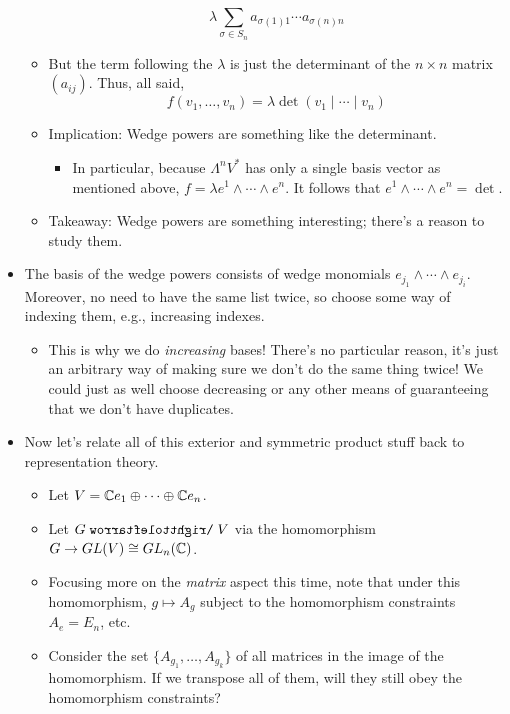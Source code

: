 \documentclass[../notes.tex]{subfiles}
\begin{document}
\begin{itemize}
\begin{itemize}
        \begin{equation*}
            \lambda\sum_{\sigma\in S_n}a_{\sigma(1)1}\cdots a_{\sigma(n)n}
        \end{equation*}
        \item But the term following the $\lambda$ is just the determinant of the $n\times n$ matrix $(a_{ij})$. Thus, all said,
        \begin{equation*}
            f(v_1,\dots,v_n) = \lambda\det(v_1\mid\cdots\mid v_n)
        \end{equation*}
        \item Implication: Wedge powers are something like the determinant.
        \begin{itemize}
            \item In particular, because $\Lambda^nV^*$ has only a single basis vector as mentioned above, $f=\lambda e^1\wedge\cdots\wedge e^n$. It follows that $e^1\wedge\cdots\wedge e^n=\det$.
        \end{itemize}
        \item Takeaway: Wedge powers are something interesting; there's a reason to study them.
    \end{itemize}
    \item The basis of the wedge powers consists of wedge monomials $e_{j_1}\wedge\cdots\wedge e_{j_i}$. Moreover, no need to have the same list twice, so choose some way of indexing them, e.g., increasing indexes.
    \begin{itemize}
        \item This is why we do \emph{increasing} bases! There's no particular reason, it's just an arbitrary way of making sure we don't do the same thing twice! We could just as well choose decreasing or any other means of guaranteeing that we don't have duplicates.
    \end{itemize}
    \item Now let's relate all of this exterior and symmetric product stuff back to representation theory.
    \begin{itemize}
        \item Let $V=\mathbb{C} e_1\oplus\cdots\oplus\mathbb{C} e_n$.
        \item Let $G\acts V$ via the homomorphism $G\to GL(V)\cong GL_n(\mathbb{C})$.
        \item Focusing more on the \emph{matrix} aspect this time, note that under this homomorphism, $g\mapsto A_g$ subject to the homomorphism constraints $A_e=E_n$, etc.
        \item Consider the set $\{A_{g_1},\dots,A_{g_k}\}$ of all matrices in the image of the homomorphism. If we transpose all of them, will they still obey the homomorphism constraints?

\end{itemize}
\end{itemize}
\end{document}
